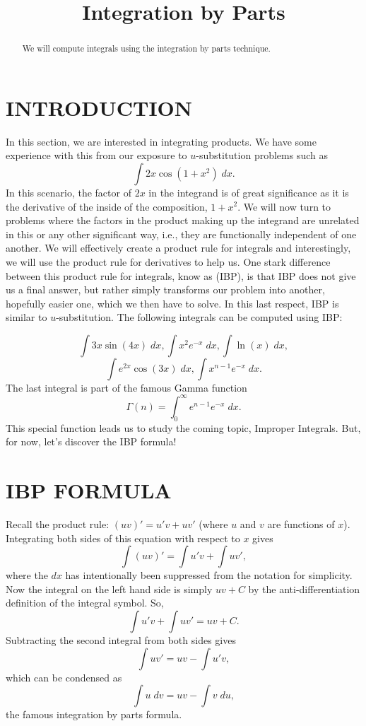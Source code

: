 \documentclass{ximera}
\title{Integration by Parts}
\begin{document}
\begin{abstract}
We will compute integrals using the integration by parts technique.
\end{abstract}

\maketitle

\section{INTRODUCTION}
In this section, we are interested in integrating products.  
We have some experience with this from our exposure to $u$-substitution problems such as
\[
\int 2x \cos(1 + x^2) \; dx.
\]
In this scenario, the factor of $2x$ in the integrand is of great significance 
as it is the derivative of the inside of the composition, $1 + x^2$.
We will now turn to problems where the factors in the product making up the integrand
are unrelated in this or any other significant way, i.e., they are functionally independent of one another.
We will effectively create a product rule for integrals and interestingly, we will 
use the product rule for derivatives to help us. One stark difference between this product rule for
integrals, know as  (IBP), is that IBP does not give us a final answer, but rather
simply transforms our problem into another, hopefully easier one, which we then have to solve.
In this last respect, IBP is similar to $u$-substitution. The following integrals can be computed using IBP:

\[
\int 3x\sin(4x) \; dx, \int x^2 e^{-x} \; dx, \int \ln(x) \; dx,
\]
\[
\int e^{2x}\cos(3x) \; dx, \int x^{n-1} e^{-x} \; dx.
\]
The last integral is part of the famous Gamma function
\[
\Gamma(n) = \int_0^\infty e^{n-1} e^{-x} \; dx.
\]
This special function leads us to study the coming topic, Improper Integrals.
But, for now, let's discover the IBP formula! 


\section{IBP FORMULA}

Recall the product rule: $(uv)' = u'v+uv'$ (where $u$ and $v$ are functions of $x$).
Integrating both sides of this equation with respect to $x$ gives
\[
\int (uv)' = \int u'v + \int uv',
\]
where the $dx$ has intentionally been suppressed from the notation for simplicity.
Now the integral on the left hand side is simply $uv + C$ by the anti-differentiation
definition of the integral symbol. So,
\[
\int u'v + \int uv' = uv + C.
\]
Subtracting the second integral from both sides gives
\[
\int uv' = uv - \int u'v,
\]
which can be condensed as
\[
\int u \; dv = uv - \int v \; du,
\]
the famous integration by parts formula.
\end{document}
